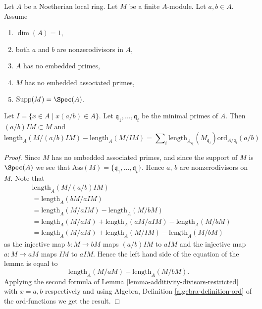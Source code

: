 \begin{lemma}
\label{lemma-no-embedded-points-modules}
Let $A$ be a Noetherian local ring.
Let $M$ be a finite $A$-module.
Let $a, b \in A$.
Assume
\begin{enumerate}
\item $\dim(A) = 1$,
\item both $a$ and $b$ are nonzerodivisors in $A$,
\item $A$ has no embedded primes,
\item $M$ has no embedded associated primes,
\item $\text{Supp}(M) = \Spec(A)$.
\end{enumerate}
Let $I = \{x \in A \mid x(a/b) \in A\}$.
Let $\mathfrak q_1, \ldots, \mathfrak q_t$ be the minimal
primes of $A$. Then $(a/b)IM \subset M$ and
$$
\text{length}_A(M/(a/b)IM)
-
\text{length}_A(M/IM)
=
\sum\nolimits_i
\text{length}_{A_{\mathfrak q_i}}(M_{\mathfrak q_i})
\text{ord}_{A/\mathfrak q_i}(a/b)
$$
\end{lemma}

\begin{proof}
Since $M$ has no embedded associated primes, and since
the support of $M$ is $\Spec(A)$ we see that
$\text{Ass}(M) = \{\mathfrak q_1, \ldots, \mathfrak q_t\}$.
Hence $a$, $b$ are nonzerodivisors on $M$. Note that
\begin{align*}
& \text{length}_A(M/(a/b)IM) \\
& = \text{length}_A(bM/aIM) \\
& = \text{length}_A(M/aIM)
-
\text{length}_A(M/bM) \\
& = \text{length}_A(M/aM) + \text{length}_A(aM/aIM) - \text{length}_A(M/bM) \\
& = \text{length}_A(M/aM) + \text{length}_A(M/IM) - \text{length}_A(M/bM)
\end{align*}
as the injective map $b : M \to bM$ maps $(a/b)IM$ to $aIM$
and the injective map $a : M \to aM$ maps $IM$ to $aIM$.
Hence the left hand side of the equation of the lemma is
equal to
$$
\text{length}_A(M/aM) - \text{length}_A(M/bM).
$$
Applying the second formula of
Lemma \ref{lemma-additivity-divisors-restricted}
with $x = a, b$ respectively
and using Algebra, Definition \ref{algebra-definition-ord}
of the $\text{ord}$-functions we get the result.
\end{proof}

